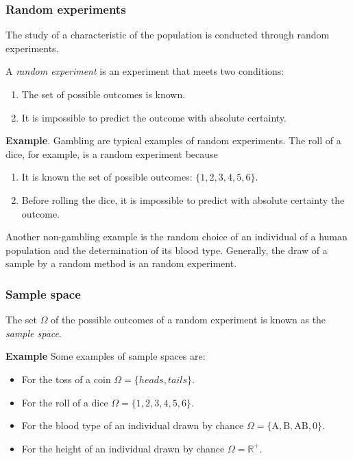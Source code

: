 \begin{frame}
\frametitle{Random experiments}
The study of a characteristic of the population is conducted through random experiments. 

\begin{definition} A \emph{random experiment} is an experiment that meets two conditions:
\begin{enumerate}
\item The set of possible outcomes is known. 
\item It is impossible to predict the outcome with absolute certainty.
\end{enumerate} 
\end{definition}

\textbf{Example}. Gambling are typical examples of random experiments. 
The roll of a dice, for example, is a random experiment because
\begin{enumerate}
\item It is known the set of possible outcomes: $\{1,2,3,4,5,6\}$.
\item Before rolling the dice, it is impossible to predict with absolute certainty the outcome. 
\end{enumerate}

Another non-gambling example is the random choice of an individual of a human population and the determination of its
blood type. 
Generally, the draw of a sample by a random method  is an random experiment.
\end{frame}


\begin{frame}
\frametitle{Sample space}
\begin{definition}
The set $\Omega$ of the possible outcomes of a random experiment is known as the \emph{sample space}.
\end{definition}

\textbf{Example} Some examples of sample spaces are:
\begin{itemize}
\item For the toss of a coin $\Omega=\{heads,tails\}$.
\item For the roll of a dice $\Omega=\{1,2,3,4,5,6\}$.
\item For the blood type of an individual drawn by chance $\Omega=\{\mbox{A},\mbox{B},\mbox{AB},\mbox{0}\}$.
\item For the height of an individual drawn by chance $\Omega=\mathbb{R}^+$.
\end{itemize}
\end{frame}


